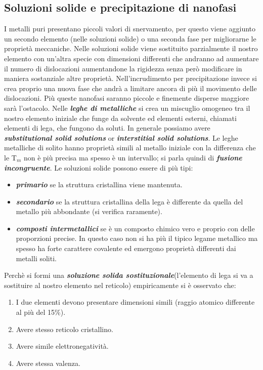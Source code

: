 \subsection{Soluzioni solide e precipitazione di nanofasi}

I metalli puri presentano piccoli valori di snervamento, per questo viene aggiunto un secondo elemento (nelle soluzioni solide) o una seconda fase per migliorarne le proprietà meccaniche.
Nelle soluzioni solide viene sostituito parzialmente il nostro elemento con un'altra specie con dimensioni differenti che andranno ad aumentare il numero di dislocazioni aumentandone la rigidezza senza però modificare in maniera sostanziale altre proprietà.
Nell'incrudimento per precipitazione invece si crea proprio una nuova fase che andrà a limitare ancora di più il movimento delle dislocazioni. Più queste nanofasi saranno piccole e finemente disperse maggiore sarà l'ostacolo.
Nelle \textbf{\textit{leghe di metalliche}} si crea un miscuglio omogeneo tra il nostro elemento iniziale che funge da solvente ed elementi esterni, chiamati elementi di lega, che fungono da soluti. In generale possiamo avere  \textbf{\textit{substitutional solid solutions}} or  \textbf{\textit{interstitial solid solutions}}.
Le leghe metalliche di solito hanno proprietà simili al metallo iniziale con la differenza che le T$_m$ non è più precisa ma spesso è un intervallo; si parla quindi di \textbf{\textit{fusione incongruente}}.
Le soluzioni solide possono essere di più tipi:
\begin{itemize}
    \item  \textbf{\textit{primario}} se la struttura cristallina viene mantenuta.
    \item  \textbf{\textit{secondario}} se la struttura cristallina della lega è differente da quella del metallo più abbondante (si verifica raramente).
    \item  \textbf{\textit{composti intermetallici}} se è un composto chimico vero e proprio con delle proporzioni precise. In questo caso non si ha più il tipico legame metallico ma spesso ha forte carattere covalente ed emergono proprietà differenti dai metalli soliti.
\end{itemize}
Perchè si formi una \textbf{\textit{soluzione solida sostituzionale}}(l'elemento di lega si va a sostituire al nostro elemento nel reticolo) empiricamente si è osservato che:
\begin{enumerate}
    \item I due elementi devono presentare dimensioni simili (raggio atomico differente al più del 15\%).
    \item Avere stesso reticolo cristallino.
    \item Avere simile elettronegatività.
    \item Avere stessa valenza.
\end{enumerate}
